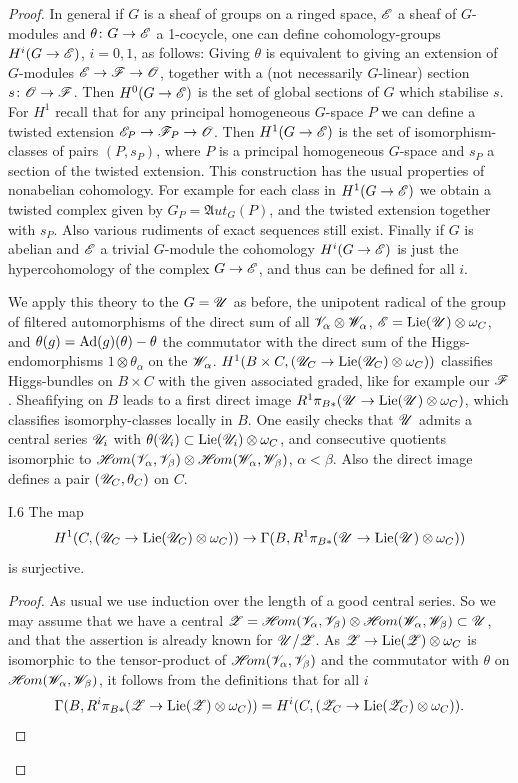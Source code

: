 \documentclass[12pt,english]{smfart}
\newcommand{\shHom}{\mathscr{H}\!om} \newcommand{\shEnd}{\mathscr{E}\!nd} \newcommand{\shAut}{\mathfrak{A}ut} \newcommand{\End}{\mathscr{E}\!nd} \newcommand{\Isom}{\mathscr{I}\!som} \newcommand{\Char}{\mathscr{C}\!har} \newcommand{\Conn}{\mathscr{C}\!onn} \newcommand{\Diff}{\mathscr{D}\!iff} \newcommand{\Bor}{\mathscr{B}or} \newcommand{\Flag}{\mathscr{F}\!lag} \renewcommand{\Im}{\mathscr{I}\!m}
\theoremstyle{plain} \newtheorem{innerthm}{Theorem} \newtheorem{innerlem}{Lemma} \newtheorem{innerprop}{Proposition} \newtheorem{innercor}{Corollary} \theoremstyle{definition} \newtheorem{innerdefn}{Definition} \newtheorem{innerconstr}{Construction} \theoremstyle{remark} \newtheorem*{remark}{Remark} \newtheorem*{remarks}{Remarks} \newtheorem*{applications}{Applications}
\begin{document}
\begin{proof}
In general if $G$ is a sheaf of groups on a ringed space, $\mathscr{E}$ a sheaf of $G$-modules and $\theta\colon G\to\mathscr{E}$ a 1-cocycle, one can define cohomology-groups $H^i(G\to\mathscr{E})$, $i=0,1$, as follows: Giving $\theta$ is equivalent to giving an extension of $G$-modules $\mathscr{E}\to\mathscr{F}\to\mathscr{O}$, together with a (not necessarily $G$-linear) section $s\colon\mathscr{O}\to\mathscr{F}$. Then $H^0(G\to\mathscr{E})$ is the set of global sections of $G$ which stabilise $s$. For $H^1$ recall that for any principal homogeneous $G$-space $P$ we can define a twisted extension $\mathscr{E}_P\to\mathscr{F}_P\to\mathscr{O}$. Then $H^1(G\to\mathscr{E})$ is the set of isomorphism-classes of pairs $(P,s_P)$, where $P$ is a principal homogeneous $G$-space and $s_P$ a section of the twisted extension. This construction has the usual properties of nonabelian cohomology. For example for each class in $H^1(G\to\mathscr{E})$ we obtain a twisted complex given by $G_P=\shAut_G(P)$, and the twisted extension together with $s_P$. Also various rudiments of exact sequences still exist. Finally if $G$ is abelian and $\mathscr{E}$ a trivial $G$-module the cohomology $H^i(G\to\mathscr{E})$ is just the hypercohomology of the complex $G\to\mathscr{E}$, and thus can be defined for all $i$.

We apply this theory to the $G=\mathscr{U}$ as before, the unipotent radical of the group of filtered automorphisms of the direct sum of all $\mathscr{V}_\alpha\otimes\mathscr{W}_\alpha$, $\mathscr{E}=\operatorname{Lie}(\mathscr{U})\otimes\omega_C$, and $\theta(g)=\operatorname{Ad}(g)(\theta)-\theta$ the commutator with the direct sum of the Higgs-endomorphisms $1\otimes\theta_\alpha$ on the $\mathscr{W}_\alpha$. $H^1(B\times C,(\mathscr{U}_C\to\operatorname{Lie}(\mathscr{U}_C)\otimes\omega_C))$ classifies Higgs-bundles on $B\times C$ with the given associated graded, like for example our $\mathscr{F}$. Sheafifying on $B$ leads to a first direct image $R^1\pi_{B*}(\mathscr{U}\to\operatorname{Lie}(\mathscr{U})\otimes\omega_C)$, which
classifies isomorphy-classes locally in $B$. One easily checks that $\mathscr{U}$ admits a central series $\mathscr{U}_i$ with $\theta(\mathscr{U}_i)\subset\operatorname{Lie}(\mathscr{U}_i)\otimes\omega_C$, and consecutive quotients isomorphic to $\shHom(\sV_\alpha,\sV_\beta)\otimes\shHom(\sW_\alpha,\sW_\beta)$, $\alpha<\beta$. Also the direct image defines a pair $(\mathscr{U}_C,\theta_C)$ on $C$.

\begin{lemma}{I.6}\label{lem:I.6}
The map
\[
H^1(C,(\mathscr{U}_C\to\operatorname{Lie}(\mathscr{U}_C)\otimes\omega_C))\to
\Gamma(B,R^1\pi_{B*}(\mathscr{U}\to\operatorname{Lie}(\mathscr{U})\otimes\omega_C))
\]
is surjective.
\end{lemma}

\begin{proof}
As usual we use induction over the length of a good central series. So we may assume that we have a central $\sZ=\shHom(\sV_\alpha,\sV_\beta)\otimes\shHom(\sW_\alpha,\sW_\beta)\subset\sU$, and that the assertion is already known for $\mathscr{U}/\mathscr{Z}$. As $\mathscr{Z}\to\operatorname{Lie}(\mathscr{Z})\otimes\omega_C$ is isomorphic to the tensor-product of $\shHom(\sV_\alpha,\sV_\beta)$ and the commutator with $\theta$ on $\shHom(\sW_\alpha,\sW_\beta)$, it follows from the definitions that for all $i$
\[
\Gamma(B,R^i\pi_{B*}(\mathscr{Z}\to\operatorname{Lie}(\mathscr{Z})\otimes\omega_C))=
H^i(C,(\mathscr{Z}_C\to\operatorname{Lie}(\mathscr{Z}_C)\otimes\omega_C)).
\]


\end{proof}
\end{proof}
\end{document}
